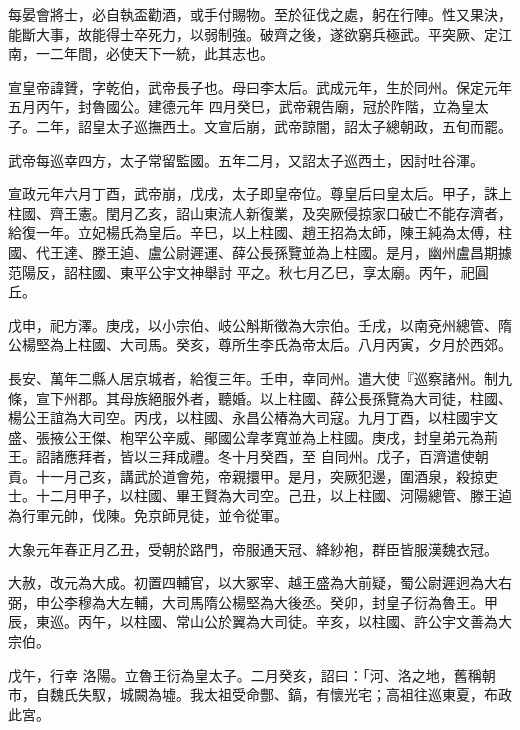 \begin{pinyinscope}
 每晏會將士，必自執盃勸酒，或手付賜物。至於征伐之處，躬在行陣。性又果決，能斷大事，故能得士卒死力，以弱制強。破齊之後，遂欲窮兵極武。平突厥、定江南，一二年間，必使天下一統，此其志也。



 宣皇帝諱贇，字乾伯，武帝長子也。母曰李太后。武成元年，生於同州。保定元年五月丙午，封魯國公。建德元年
 四月癸巳，武帝親告廟，冠於阼階，立為皇太子。二年，詔皇太子巡撫西土。文宣后崩，武帝諒闇，詔太子總朝政，五旬而罷。



 武帝每巡幸四方，太子常留監國。五年二月，又詔太子巡西土，因討吐谷渾。



 宣政元年六月丁酉，武帝崩，戊戌，太子即皇帝位。尊皇后曰皇太后。甲子，誅上柱國、齊王憲。閏月乙亥，詔山東流人新復業，及突厥侵掠家口破亡不能存濟者，給復一年。立妃楊氏為皇后。辛巳，以上柱國、趙王招為太師，陳王純為太傅，柱國、代王達、滕王逌、盧公尉遲運、薛公長孫覽並為上柱國。是月，幽州盧昌期據范陽反，詔柱國、東平公宇文神舉討
 平之。秋七月乙巳，享太廟。丙午，祀圓丘。



 戊申，祀方澤。庚戌，以小宗伯、岐公斛斯徵為大宗伯。壬戌，以南兗州總管、隋公楊堅為上柱國、大司馬。癸亥，尊所生李氏為帝太后。八月丙寅，夕月於西郊。



 長安、萬年二縣人居京城者，給復三年。壬申，幸同州。遣大使『巡察諸州。制九條，宣下州郡。其母族絕服外者，聽婚。以上柱國、薛公長孫覽為大司徒，柱國、楊公王誼為大司空。丙戌，以柱國、永昌公椿為大司寇。九月丁酉，以柱國宇文盛、張掖公王傑、枹罕公辛威、鄖國公韋孝寬並為上柱國。庚戌，封皇弟元為荊王。詔諸應拜者，皆以三拜成禮。冬十月癸酉，至
 自同州。戊子，百濟遣使朝貢。十一月己亥，講武於道會苑，帝親擐甲。是月，突厥犯邊，圍酒泉，殺掠吏士。十二月甲子，以柱國、畢王賢為大司空。己丑，以上柱國、河陽總管、滕王逌為行軍元帥，伐陳。免京師見徒，並令從軍。



 大象元年春正月乙丑，受朝於路門，帝服通天冠、絳紗袍，群臣皆服漢魏衣冠。



 大赦，改元為大成。初置四輔官，以大冢宰、越王盛為大前疑，蜀公尉遲迥為大右弼，申公李穆為大左輔，大司馬隋公楊堅為大後丞。癸卯，封皇子衍為魯王。甲辰，東巡。丙午，以柱國、常山公於翼為大司徒。辛亥，以柱國、許公宇文善為大宗伯。



 戊午，行幸
 洛陽。立魯王衍為皇太子。二月癸亥，詔曰：「河、洛之地，舊稱朝市，自魏氏失馭，城闕為墟。我太祖受命酆、鎬，有懷光宅；高祖往巡東夏，布政此宮。




\end{pinyinscope}

